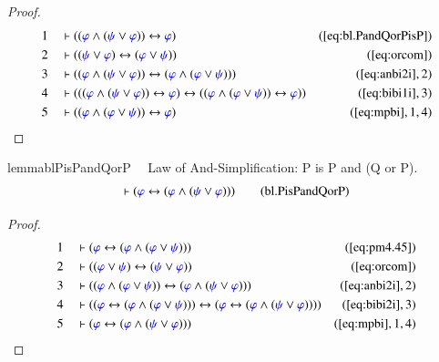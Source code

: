 \begin{proof}
\begin{align}
  1 &&  & \vdash ( ( \mw{\varphi} \wedge ( \mw{\psi} \vee \mw{\varphi} ) )
      \leftrightarrow \mw{\varphi}
      )&(\mbox{\ref{eq:bl.PandQorPisP}})\notag
  \\ 2 &&  & \vdash ( ( \mw{\psi} \vee \mw{\varphi} ) \leftrightarrow (
      \mw{\varphi} \vee \mw{\psi} )
      )&(\mbox{\ref{eq:orcom}})\notag
  \\ 3 &&  & \vdash ( ( \mw{\varphi} \wedge ( \mw{\psi} \vee \mw{\varphi} ) )
      \leftrightarrow ( \mw{\varphi} \wedge ( \mw{\varphi}
      \vee \mw{\psi} ) ) )&(\mbox{\ref{eq:anbi2i}},2)\notag
  \\ 4 &&  & \vdash ( ( ( \mw{\varphi} \wedge ( \mw{\psi} \vee \mw{\varphi} ) )
      \leftrightarrow \mw{\varphi} ) \leftrightarrow ( (
      \mw{\varphi} \wedge ( \mw{\varphi} \vee \mw{\psi} ) )
      \leftrightarrow \mw{\varphi} )
      )&(\mbox{\ref{eq:bibi1i}},3)\notag
  \\ 5 &&  & \vdash ( ( \mw{\varphi} \wedge ( \mw{\varphi} \vee \mw{\psi} ) )
      \leftrightarrow \mw{\varphi}
      )&(\mbox{\ref{eq:mpbi}},1,4)\notag
\end{align}
\end{proof}

\begin{restatable}{lemma}{blPisPandQorP}~~ Law of And-Simplification: P is P
and (Q or P).
\begin{align}
\vdash ( \mw{\varphi} \leftrightarrow ( \mw{\varphi} \wedge ( \mw{\psi} \vee
    \mw{\varphi} ) ) )\label{eq:bl.PisPandQorP}\tag{bl.PisPandQorP}
\end{align}
\end{restatable}

\begin{proof}
\begin{align}
  1 &&  & \vdash ( \mw{\varphi} \leftrightarrow ( \mw{\varphi} \wedge (
      \mw{\varphi} \vee \mw{\psi} ) )
      )&(\mbox{\ref{eq:pm4.45}})\notag
  \\ 2 &&  & \vdash ( ( \mw{\varphi} \vee \mw{\psi} ) \leftrightarrow (
      \mw{\psi} \vee \mw{\varphi} )
      )&(\mbox{\ref{eq:orcom}})\notag
  \\ 3 &&  & \vdash ( ( \mw{\varphi} \wedge ( \mw{\varphi} \vee \mw{\psi} ) )
      \leftrightarrow ( \mw{\varphi} \wedge ( \mw{\psi}
      \vee \mw{\varphi} ) )
      )&(\mbox{\ref{eq:anbi2i}},2)\notag
  \\ 4 &&  & \vdash ( ( \mw{\varphi} \leftrightarrow ( \mw{\varphi} \wedge (
      \mw{\varphi} \vee \mw{\psi} ) ) ) \leftrightarrow (
      \mw{\varphi} \leftrightarrow ( \mw{\varphi} \wedge (
      \mw{\psi} \vee \mw{\varphi} ) ) )
      )&(\mbox{\ref{eq:bibi2i}},3)\notag
  \\ 5 &&  & \vdash ( \mw{\varphi} \leftrightarrow ( \mw{\varphi} \wedge (
      \mw{\psi} \vee \mw{\varphi} ) )
      )&(\mbox{\ref{eq:mpbi}},1,4)\notag
\end{align}
\end{proof}

